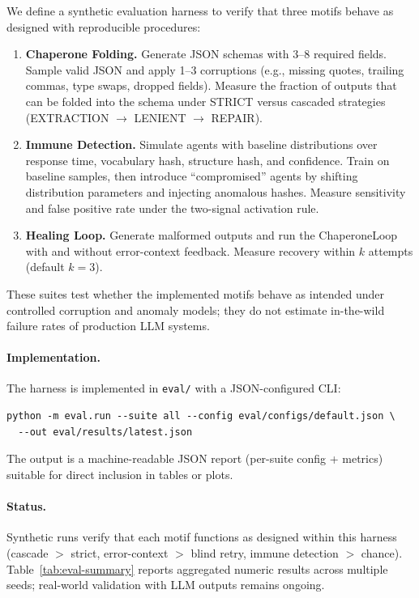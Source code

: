 We define a synthetic evaluation harness to verify that three motifs behave as designed with reproducible procedures:
\begin{enumerate}[leftmargin=*]
\item \textbf{Chaperone Folding.} Generate JSON schemas with 3--8 required fields. Sample valid JSON and
apply 1--3 corruptions (e.g., missing quotes, trailing commas, type swaps, dropped fields). Measure the
fraction of outputs that can be folded into the schema under STRICT versus cascaded strategies
(EXTRACTION $\to$ LENIENT $\to$ REPAIR).
\item \textbf{Immune Detection.} Simulate agents with baseline distributions over response time,
vocabulary hash, structure hash, and confidence. Train on baseline samples, then introduce
``compromised'' agents by shifting distribution parameters and injecting anomalous hashes.
Measure sensitivity and false positive rate under the two-signal activation rule.
\item \textbf{Healing Loop.} Generate malformed outputs and run the ChaperoneLoop with and without
error-context feedback. Measure recovery within $k$ attempts (default $k=3$).
\end{enumerate}
These suites test whether the implemented motifs behave as intended under controlled corruption and anomaly
models; they do not estimate in-the-wild failure rates of production LLM systems.

\paragraph{Implementation.}
The harness is implemented in \texttt{eval/} with a JSON-configured CLI:
\begin{verbatim}
python -m eval.run --suite all --config eval/configs/default.json \
  --out eval/results/latest.json
\end{verbatim}
The output is a machine-readable JSON report (per-suite config + metrics) suitable for direct inclusion
in tables or plots.

\paragraph{Status.}
Synthetic runs verify that each motif functions as designed within this harness (cascade $>$ strict, error-context $>$ blind retry,
immune detection $>$ chance). Table~\ref{tab:eval-summary} reports aggregated numeric results across
multiple seeds; real-world validation with LLM outputs remains ongoing.

